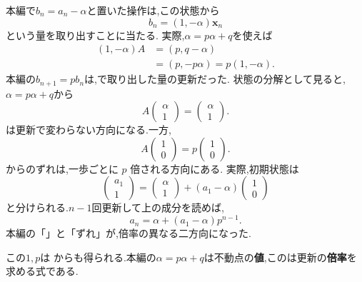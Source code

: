 本編で$b_n=a_n-\alpha$と置いた操作は,この状態から
\[
  b_n=(1,-\alpha)\boldsymbol{x}_n
\]
という量を取り出すことに当たる.
実際,$\alpha=p\alpha+q$を使えば
\[
  \begin{aligned}
    (1,-\alpha)A
    &=(p,q-\alpha)\\
    &=(p,-p\alpha)=p(1,-\alpha).
  \end{aligned}
\]
本編の$b_{n+1}=pb_n$は,で取り出した量の更新だった.
状態の分解として見ると,$\alpha=p\alpha+q$から
\[
  A\begin{pmatrix}\alpha\\1\end{pmatrix}
  =
  \begin{pmatrix}\alpha\\1\end{pmatrix}.
\]
は更新で変わらない方向になる.一方,
\[
  A\begin{pmatrix}1\\0\end{pmatrix}
  =
  p\begin{pmatrix}1\\0\end{pmatrix}.
\]
からのずれは,一歩ごとに $p$ 倍される方向にある.
実際,初期状態は
\[
  \begin{pmatrix}a_1\\1\end{pmatrix}
  =
  \begin{pmatrix}\alpha\\1\end{pmatrix}
  +(a_1-\alpha)\begin{pmatrix}1\\0\end{pmatrix}
\]
と分けられる.$n-1$回更新して上の成分を読めば,
\[
  a_n=\alpha+(a_1-\alpha)p^{n-1}.
\]
本編の「」と「ずれ」が,倍率の異なる二方向になった.

この$1,p$は
\BookMathLayout{\[
    \det(\lambda I-A)
    =
    \det\begin{pmatrix}\lambda-p&-q\\0&\lambda-1\end{pmatrix}
    =(\lambda-p)(\lambda-1)=0
  \]}{
  \[
    \begin{aligned}
      \det(\lambda I-A)&=\det\begin{pmatrix}\lambda-p&-q\\0&\lambda-1\end{pmatrix}\\
      &=(\lambda-p)(\lambda-1)=0
    \end{aligned}
  \]
}
からも得られる.本編の$\alpha=p\alpha+q$は不動点の\textbf{値},このは更新の\textbf{倍率}を求める式である.

